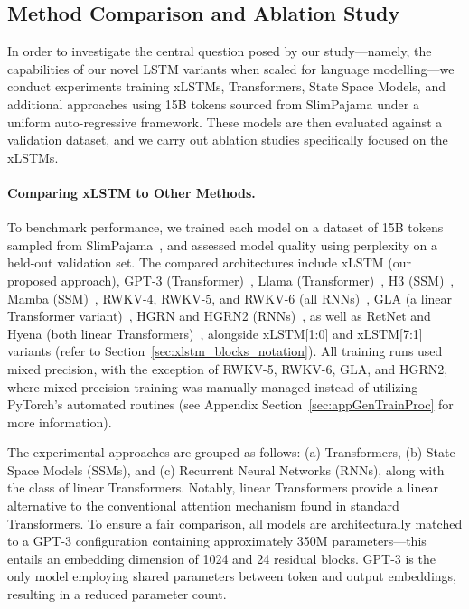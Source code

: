 \subsection{Method Comparison and Ablation Study}
\label{sec:ExpComparison}

In order to investigate the central question posed by our study—namely, the capabilities of our novel LSTM variants when scaled for language modelling—we conduct experiments training xLSTMs, Transformers, State Space Models, and additional approaches using 15B tokens sourced from SlimPajama under a uniform auto-regressive framework. These models are then evaluated against a validation dataset, and we carry out ablation studies specifically focused on the xLSTMs.

\paragraph{Comparing xLSTM to Other Methods.} To benchmark performance, we trained each model on a dataset of 15B tokens sampled from SlimPajama~\citep{Soboleva:23}, and assessed model quality using perplexity on a held-out validation set. The compared architectures include xLSTM (our proposed approach), GPT-3 (Transformer)~\citep{Brown:20short}, Llama (Transformer)~\citep{Touvron:23arxiv}, H3 (SSM)~\citep{Fu:23}, Mamba (SSM)~\citep{Gu:24arxiv}, RWKV-4, RWKV-5, and RWKV-6 (all RNNs)~\citep{Peng:23arxivshort, Peng:24arxivshort}, GLA (a linear Transformer variant)~\citep{Yang:23arxiv}, HGRN and HGRN2 (RNNs)~\citep{Qin:23, Qin:24arxiv}, as well as RetNet and Hyena (both linear Transformers)~\citep{Sun:23arxiv, Poli:23}, alongside xLSTM[1:0] and xLSTM[7:1] variants (refer to Section~\ref{sec:xlstm_blocks_notation}). All training runs used mixed precision, with the exception of RWKV-5, RWKV-6, GLA, and HGRN2, where mixed-precision training was manually managed instead of utilizing PyTorch's automated routines (see Appendix Section~\ref{sec:appGenTrainProc} for more information).

The experimental approaches are grouped as follows: (a) Transformers, (b) State Space Models (SSMs), and (c) Recurrent Neural Networks (RNNs), along with the class of linear Transformers. Notably, linear Transformers provide a linear alternative to the conventional attention mechanism found in standard Transformers. To ensure a fair comparison, all models are architecturally matched to a GPT-3 configuration containing approximately 350M parameters—this entails an embedding dimension of 1024 and 24 residual blocks. GPT-3 is the only model employing shared parameters between token and output embeddings, resulting in a reduced parameter count.

